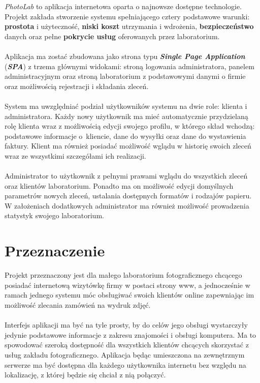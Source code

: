 \quad \textit{PhotoLab} to aplikacja internetowa oparta o najnowsze dostępne technologie. Projekt zakłada stworzenie systemu spełniającego cztery podstawowe warunki: \textbf{prostota} i użyteczność, \textbf{niski koszt} utrzymania i wdrożenia, \textbf{bezpieczeństwo} danych oraz pełne \textbf{pokrycie usług} oferowanych przez laboratorium.\\
\\
Aplikacja ma zostać zbudowana jako strona typu \textit{\textbf{Single Page Application}} (\textit{\textbf{SPA}}) z trzema głównymi widokami: stroną logowania administratora, panelem administracyjnym oraz stroną laboratorium z podstawowymi danymi o firmie oraz możliwością rejestracji i składania zleceń.\\
\\
System ma uwzględniać podział użytkowników systemu na dwie role: klienta i administratora.
Każdy nowy użytkownik ma mieć automatycznie przydzielaną rolę klienta wraz z możliwością edycji swojego profilu, w którego skład wchodzą: podstawowe informacje o~kliencie, dane do wysyłki oraz dane do wystawienia faktury. Klient ma również posiadać możliwość wglądu w historię swoich zleceń wraz ze wszystkimi szczegółami ich realizacji.\\
\\
Administrator to użytkownik z pełnymi prawami wglądu do wszystkich zleceń oraz klientów laboratorium. Ponadto ma on możliwość edycji domyślnych parametrów nowych zleceń, ustalania dostępnych formatów i rodzajów papieru. W założeniach dodatkowych administrator ma również możliwość prowadzenia statystyk swojego laboratorium.


\section{Przeznaczenie}

\quad Projekt przeznaczony jest dla małego laboratorium fotograficznego chcącego posiadać internetową wizytówkę firmy w postaci strony www, a jednocześnie w ramach jednego systemu móc obsługiwać swoich klientów online zapewniając im możliwość zlecania zamówień na wydruk zdjęć. \\
\\
Interfejs aplikacji ma być na tyle prosty, by do celów jego obsługi wystarczyły jedynie podstawowe informacje z zakresu znajomości i obsługi komputera. Ma to spowodować szeroką dostępność dla wszystkich klientów chcących skorzystać z usług zakładu fotograficznego. Aplikacja będąc umieszczona na zewnętrznym serwerze ma być dostępna dla każdego użytkownika internetu bez względu na lokalizację, z której będzie się chciał z nią połączyć.

